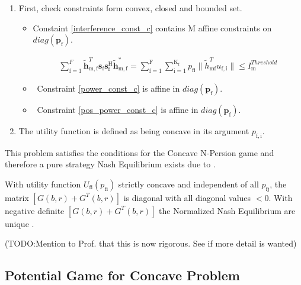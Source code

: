 \documentclass[12pt,a4paper]{report}
\begin{document}
\begin{enumerate}


\item
First, check constraints form convex, closed and bounded set. 

\begin{itemize}

\item
	Constaint \eqref{interference_const_c} contains $\text{M}$ affine constraints on $diag(\mathbf{p_{\mathrm{f}}})$.

\begin{gather*}
	  \sum^F_{\text{f}=1} \mathbf{\tilde{h}}_{\mathrm{m,f}}^T  \mathbf{s}_{\mathrm{f}} 						
	\mathbf{s_{\mathrm{f}}^{\mathrm{H}}} \mathbf{\tilde{h}_{\mathrm{m,f}}^*} 
	=
	\sum_{\mathrm{f=1}}^{\mathrm{F}}	\sum_{\mathrm{i=1}}^{\mathrm{K_f}}
	p_{\mathrm{fi}}\|\tilde{h}_{\mathrm{mf}}^T u_{\mathrm{f,i}}\|
	\leq I^{Threshold}_{\mathrm{m}} 
\end{gather*}

\item \
	Constraint \eqref{power_const_c} is  affine in $diag(\mathbf{p_{\mathrm{f}}})$.
	
\item \
	Constraint \eqref{pos_power_const_c} is affine in $diag(\mathbf{p_{\mathrm{f}}})$.
\end{itemize}


\item The utility function is defined as being concave in its argument $p_{\mathrm{f,i}}$. 

\end{enumerate}

This problem satisfies the conditions for the Concave N-Persion game and therefore a pure strategy Nash Equilibrium exists due to 
\cite[Thm1]{rosen1964existence}.

With utility function $U_{\mathrm{fi}}(p_{\mathrm{fi}})$ strictly concave and independent of all $p_{\mathrm{fj}}$, the matrix $[G(b,r)+G^{T}(b,r)] $ is diagonal with all diagonal values $<0$. With negative definite $[G(b,r)+G^{T}(b,r)] $ the Normalized Nash Equilibrium are unique \cite[Thm4]{rosen1964existence}.

(TODO:Mention to Prof. that this is now rigorous. See if more detail is wanted)

\subsection{Potential Game for Concave Problem}
\end{document}
